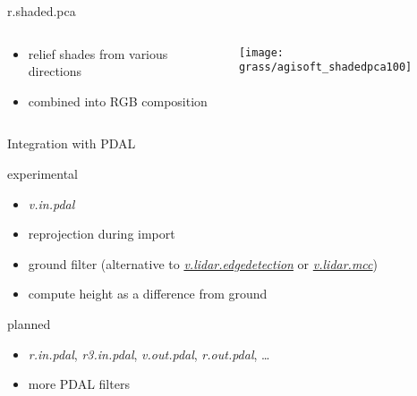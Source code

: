 \documentclass[xcolor={dvipsnames,usenames},beamer,aspectratio=169]{beamer}
\newcommand{\gmodule}[1]{\href{http://grass.osgeo.org/grass71/manuals/#1.html}{\emph{#1}}}
\newcommand{\module}[1]{\emph{#1}}
\begin{document}
\begin{frame}{r.shaded.pca}

\begin{columns}
\begin{column}{0.35\textwidth}

\begin{itemize}
  \item relief shades from various directions
  \item combined into RGB composition
\end{itemize}

\end{column}
\begin{column}{0.6\textwidth}

\begin{center}
  \texttt{[image: grass/agisoft\_shadedpca100]}
\end{center}

\end{column}
\end{columns}

\end{frame}


\begin{frame}{Integration with PDAL}

\begin{block}{experimental}
 \begin{itemize}
  \item \module{v.in.pdal}
  \item reprojection during import
  \item ground filter
    (alternative to \gmodule{v.lidar.edgedetection} or \gmodule{v.lidar.mcc})
  \item compute height as a difference from ground
 \end{itemize}
\end{block}

\begin{block}{planned}
 \begin{itemize}
  \item \module{r.in.pdal}, \module{r3.in.pdal}, \module{v.out.pdal}, \module{r.out.pdal}, \ldots
  \item more PDAL filters
 \end{itemize}
\end{block}

\end{frame}
\end{document}
